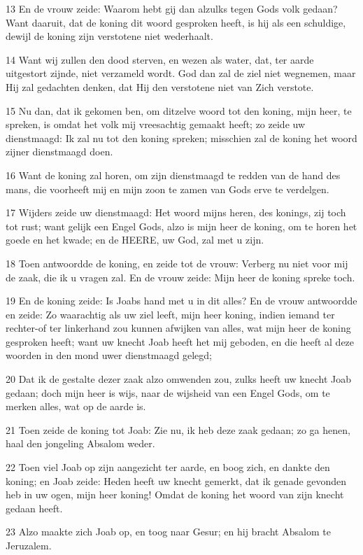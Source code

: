 \par 13 En de vrouw zeide: Waarom hebt gij dan alzulks tegen Gods volk gedaan? Want daaruit, dat de koning dit woord gesproken heeft, is hij als een schuldige, dewijl de koning zijn verstotene niet wederhaalt.
\par 14 Want wij zullen den dood sterven, en wezen als water, dat, ter aarde uitgestort zijnde, niet verzameld wordt. God dan zal de ziel niet wegnemen, maar Hij zal gedachten denken, dat Hij den verstotene niet van Zich verstote.
\par 15 Nu dan, dat ik gekomen ben, om ditzelve woord tot den koning, mijn heer, te spreken, is omdat het volk mij vreesachtig gemaakt heeft; zo zeide uw dienstmaagd: Ik zal nu tot den koning spreken; misschien zal de koning het woord zijner dienstmaagd doen.
\par 16 Want de koning zal horen, om zijn dienstmaagd te redden van de hand des mans, die voorheeft mij en mijn zoon te zamen van Gods erve te verdelgen.
\par 17 Wijders zeide uw dienstmaagd: Het woord mijns heren, des konings, zij toch tot rust; want gelijk een Engel Gods, alzo is mijn heer de koning, om te horen het goede en het kwade; en de HEERE, uw God, zal met u zijn.
\par 18 Toen antwoordde de koning, en zeide tot de vrouw: Verberg nu niet voor mij de zaak, die ik u vragen zal. En de vrouw zeide: Mijn heer de koning spreke toch.
\par 19 En de koning zeide: Is Joabs hand met u in dit alles? En de vrouw antwoordde en zeide: Zo waarachtig als uw ziel leeft, mijn heer koning, indien iemand ter rechter-of ter linkerhand zou kunnen afwijken van alles, wat mijn heer de koning gesproken heeft; want uw knecht Joab heeft het mij geboden, en die heeft al deze woorden in den mond uwer dienstmaagd gelegd;
\par 20 Dat ik de gestalte dezer zaak alzo omwenden zou, zulks heeft uw knecht Joab gedaan; doch mijn heer is wijs, naar de wijsheid van een Engel Gods, om te merken alles, wat op de aarde is.
\par 21 Toen zeide de koning tot Joab: Zie nu, ik heb deze zaak gedaan; zo ga henen, haal den jongeling Absalom weder.
\par 22 Toen viel Joab op zijn aangezicht ter aarde, en boog zich, en dankte den koning; en Joab zeide: Heden heeft uw knecht gemerkt, dat ik genade gevonden heb in uw ogen, mijn heer koning! Omdat de koning het woord van zijn knecht gedaan heeft.
\par 23 Alzo maakte zich Joab op, en toog naar Gesur; en hij bracht Absalom te Jeruzalem.
